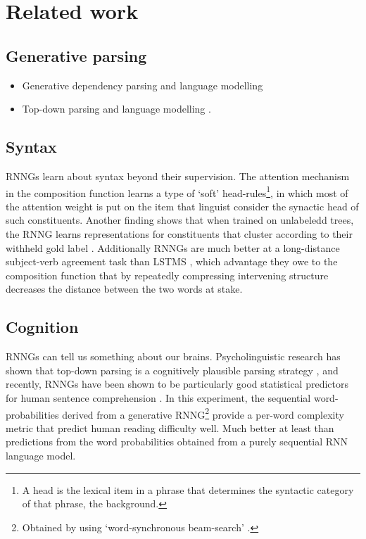 \section{Related work}

\subsection{Generative parsing}
\begin{itemize}
  \item Generative dependency parsing and language modelling \citep{titov2007generative,buys2015bayesian,buys2015generative,buys2018exact}
  \item Top-down parsing and language modelling \citep{roark2001probabilistic}.
\end{itemize}

\subsection{Syntax} RNNGs learn about syntax beyond their supervision. The attention mechanism in the composition function learns a type of `soft' head-rules\footnote{A head is the lexical item in a phrase that determines the syntactic category of that phrase, \cf the background.}, in which most of the attention weight is put on the item that linguist consider the synactic head of such constituents. Another finding shows that when trained on unlabeledd trees, the RNNG learns representations for constituents that cluster according to their withheld gold label \citep{kuncoro2017syntax}. Additionally RNNGs are much better at a long-distance subject-verb agreement task than LSTMS \citep{linzen2016syntax,kuncoro2018learn}, which advantage they owe to the composition function that by repeatedly compressing intervening structure decreases the distance between the two words at stake.

\subsection{Cognition} RNNGs can tell us something about our brains. Psycholinguistic research has shown that top-down parsing is a cognitively plausible parsing strategy \citep{brennan2016abstract}, and recently, RNNGs have been shown to be particularly good statistical predictors for human sentence comprehension \citep{hale2018beam}. In this experiment, the sequential word-probabilities derived from a generative RNNG\footnote{Obtained by using `word-synchronous beam-search' \citep{stern2017beam}.} provide a per-word complexity metric that predict human reading difficulty well. Much better at least than predictions from the word probabilities obtained from a purely sequential RNN language model.
